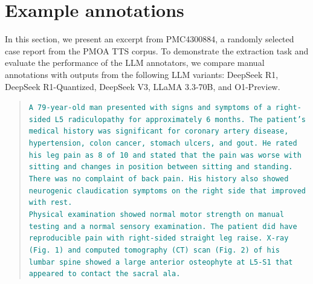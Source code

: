 \documentclass[pmlr]{jmlr}%
\begin{document}
\section{Example annotations}

In this section, we present an excerpt from PMC4300884, a randomly selected case report from the PMOA TTS corpus. To demonstrate the extraction task and evaluate the performance of the LLM annotators, we compare manual annotations with outputs from the following LLM variants: DeepSeek R1, DeepSeek R1-Quantized, DeepSeek V3, LLaMA 3.3-70B, and O1-Preview.

\begin{quote}
\textcolor{teal}{\texttt{A 79-year-old man presented with signs and symptoms of a right-sided L5 radiculopathy for approximately 6 months. The patient's medical history was significant for coronary artery disease, hypertension, colon cancer, stomach ulcers, and gout. He rated his leg pain as 8 of 10 and stated that the pain was worse with sitting and changes in position between sitting and standing. There was no complaint of back pain. His history also showed neurogenic claudication symptoms on the right side that improved with rest. \\ Physical examination showed normal motor strength on manual testing and a normal sensory examination. The patient did have reproducible pain with right-sided straight leg raise. X-ray (Fig. 1) and computed tomography (CT) scan (Fig. 2) of his lumbar spine showed a large anterior osteophyte at L5-S1 that appeared to contact the sacral ala.}}
\end{quote}

%
\end{document}
